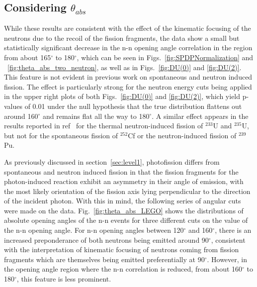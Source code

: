 \documentclass[%
 reprint,
 amsmath,amssymb,
 aps,
 nofootinbib
]{revtex4-1}
\begin{document}
\subsection{Considering $\theta_{abs}$}
\label{sec:anomaly}
While these results are consistent with the effect of the kinematic focusing of the neutrons due to the recoil of the fission fragments, the data show a small but statistically significant decrease in the n-n opening angle correlation in the region from about 165$^{\circ}$ to 180$^{\circ}$, which can be seen in Figs.~\ref{fig:SPDPNormalization} and ~\ref{fig:theta_abs_two_neutron}, as well as in Figs.~\ref{fig:DU(0)} and \ref{fig:DU(2)}.
This feature is not evident in previous work on spontaneous and neutron induced fission.
The effect is particularly strong for the neutron energy cuts being applied in the upper right plots of both Figs.~\ref{fig:DU(0)} and \ref{fig:DU(2)}, which yield p-values of 0.01 under the null hypothesis that the true distribution flattens out around 160$^{\circ}$ and remains flat all the way to 180$^{\circ}$.
A similar effect appears in the results reported in ref~\cite{Sokolov2010} for the thermal neutron-induced fission of $^{233}$U and $^{235}$U, but not for the spontaneous fission of $^{252}$Cf or the neutron-induced fission of $^{239}$Pu.

As previously discussed in section~\ref{sec:level1}, photofission differs from spontaneous and neutron induced fission in that the fission fragments for the photon-induced reaction exhibit an asymmetry in their angle of emission, with the most likely orientation of the fission axis lying perpendicular to the direction of the incident photon.
With this in mind, the following series of angular cuts were made on the data.
Fig.~\ref{fig:theta_abs_LEGO} shows the distributions of absolute opening angles of the n-n events for three different cuts on the value of the n-n opening angle.
For n-n opening angles between 120$^{\circ}$ and 160$^{\circ}$, there is an increased preponderance of both neutrons being emitted around 90$^{\circ}$, consistent with the interpretation of kinematic focusing of neutrons coming from fission fragments which are themselves being emitted preferentially at 90$^{\circ}$.
However, in the opening angle region where the n-n correlation is reduced, from about 160$^{\circ}$ to 180$^{\circ}$, this feature is less prominent.
\end{document}

